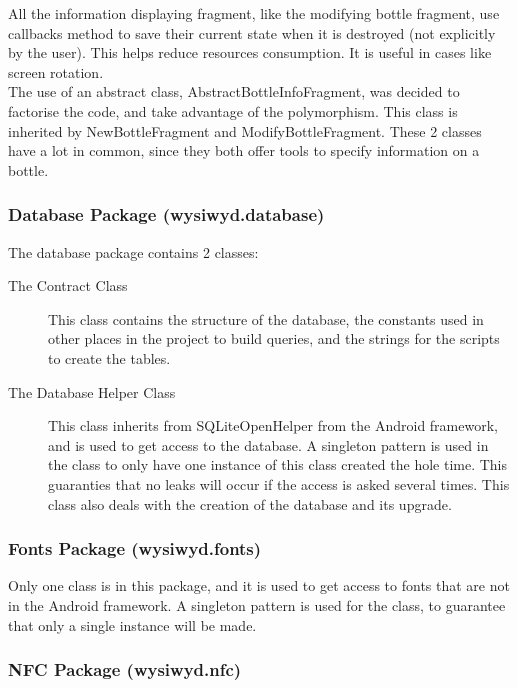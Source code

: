 All the information displaying fragment, like the modifying bottle fragment, use callbacks method to save their current state when it is destroyed (not explicitly by the user). This helps reduce resources consumption. It is useful in cases like screen rotation.\\

The use of an abstract class, AbstractBottleInfoFragment, was decided to factorise the code, and take advantage of the polymorphism. This class is inherited by NewBottleFragment and ModifyBottleFragment. These 2 classes have a lot in common, since they both offer tools to specify information on a bottle.

\subsubsection{Database Package (wysiwyd.database)}

The database package contains 2 classes:

\begin{description}
\item[The Contract Class] This class contains the structure of the database, the constants used in other places in the project to build queries, and the strings for the scripts to create the tables.

\item[The Database Helper Class] This class inherits from SQLiteOpenHelper from the Android framework, and is used to get access to the database. A singleton pattern is used in the class to only have one instance of this class created the hole time. This guaranties that no leaks will occur if the access is asked several times. This class also deals with the creation of the database and its upgrade.
\end{description}

\subsubsection{Fonts Package (wysiwyd.fonts)}

Only one class is in this package, and it is used to get access to fonts that are not in the Android framework. A singleton pattern is used for the class, to guarantee that only a single instance will be made.

\subsubsection{NFC Package (wysiwyd.nfc)}

